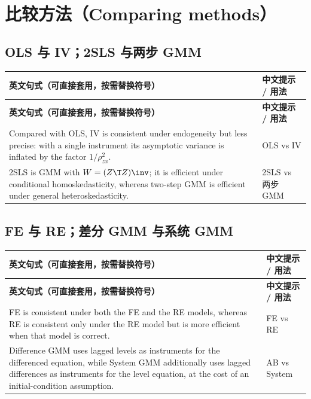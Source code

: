 \section{比较方法（Comparing methods）}\label{sec:UappC-compare}

\subsection{OLS 与 IV；2SLS 与两步 GMM}

{\renewcommand{\arraystretch}{1.15}\begin{longtable}{@{}>{\raggedright\arraybackslash}p{11.4cm}>{\raggedright\arraybackslash\small}p{4.3cm}@{}}
\toprule
\textbf{英文句式（可直接套用，按需替换符号）} & \textbf{中文提示 / 用法}\\
\midrule
\endfirsthead
\toprule
\textbf{英文句式（可直接套用，按需替换符号）} & \textbf{中文提示 / 用法}\\
\midrule
\endhead
\bottomrule
\endlastfoot
Compared with OLS, IV is consistent under endogeneity but less precise: with a single instrument its asymptotic variance is inflated by the factor $1/\rho_{zx}^2$. & OLS vs IV\\
\addlinespace[2pt]
2SLS is GMM with $W=(Z\T Z)\inv$; it is efficient under conditional homoskedasticity, whereas two-step GMM is efficient under general heteroskedasticity. & 2SLS vs 两步 GMM\\
\end{longtable}}


\subsection{FE 与 RE；差分 GMM 与系统 GMM}

{\renewcommand{\arraystretch}{1.15}\begin{longtable}{@{}>{\raggedright\arraybackslash}p{11.4cm}>{\raggedright\arraybackslash\small}p{4.3cm}@{}}
\toprule
\textbf{英文句式（可直接套用，按需替换符号）} & \textbf{中文提示 / 用法}\\
\midrule
\endfirsthead
\toprule
\textbf{英文句式（可直接套用，按需替换符号）} & \textbf{中文提示 / 用法}\\
\midrule
\endhead
\bottomrule
\endlastfoot
FE is consistent under both the FE and the RE models, whereas RE is consistent only under the RE model but is more efficient when that model is correct. & FE vs RE\\
\addlinespace[2pt]
Difference GMM uses lagged levels as instruments for the differenced equation, while System GMM additionally uses lagged differences as instruments for the level equation, at the cost of an initial-condition assumption. & AB vs System\\
\end{longtable}}


